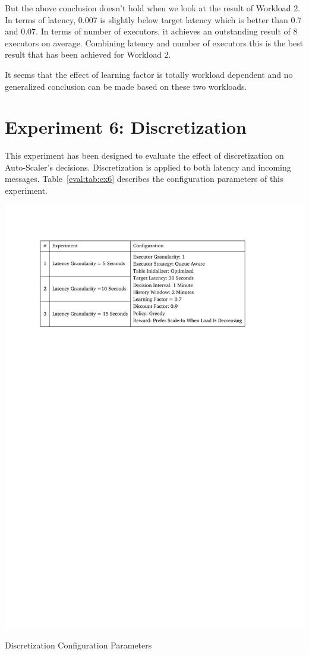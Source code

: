But the above conclusion doesn't hold when we look at the result of Workload 2. In terms of latency, 0.007 is slightly below target latency which is better than 0.7 and 0.07. In terms of number of executors, it achieves an outstanding result of 8 executors on average. Combining latency and number of executors this is the best result that has been achieved for Workload 2.

It seems that the effect of learning factor is totally workload dependent and no generalized conclusion can be made based on these two workloads.
\clearpage
\section{Experiment 6: Discretization}
This experiment has been designed to evaluate the effect of discretization on Auto-Scaler's decisions. Discretization is applied to both latency and incoming messages. Table~\ref{eval:tab:ex6} describes the configuration parameters of this experiment.
\begin{table}[h]
    \includegraphics[clip,trim=2.2cm 21.18cm 3cm 2.5cm]{tables/ex6.pdf}
    \centering
    \caption{Discretization Configuration Parameters}
    \label{eval:tab:ex6}
\end{table}


